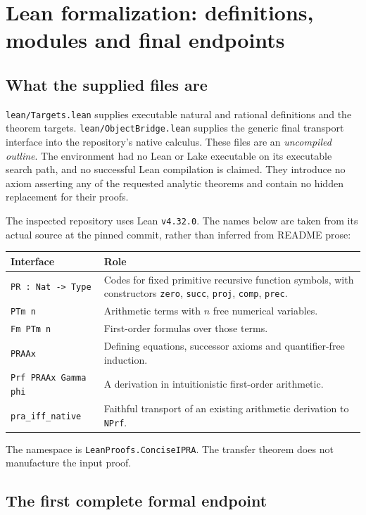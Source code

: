 \section{Lean formalization: definitions, modules and final endpoints}
\label{sec:lean}

\subsection{What the supplied files are}

\texttt{lean/Targets.lean} supplies executable natural and rational definitions and the theorem targets. \texttt{lean/ObjectBridge.lean} supplies the generic final transport interface into the repository's native calculus. These files are an \emph{uncompiled outline}. The environment had no Lean or Lake executable on its executable search path, and no successful Lean compilation is claimed. They introduce no axiom asserting any of the requested analytic theorems and contain no hidden replacement for their proofs.

The inspected repository uses Lean \texttt{v4.32.0}. The names below are taken from its actual source at the pinned commit, rather than inferred from README prose:
\begin{center}
\begin{tabularx}{\textwidth}{@{}p{48mm}X@{}}
\toprule
Interface & Role \\
\midrule
\texttt{PR : Nat -> Type} & Codes for fixed primitive recursive function symbols, with constructors \texttt{zero}, \texttt{succ}, \texttt{proj}, \texttt{comp}, \texttt{prec}. \\
\texttt{PTm n} & Arithmetic terms with $n$ free numerical variables. \\
\texttt{Fm PTm n} & First-order formulas over those terms. \\
\texttt{PRAAx} & Defining equations, successor axioms and quantifier-free induction. \\
\texttt{Prf PRAAx Gamma phi} & A derivation in intuitionistic first-order arithmetic. \\
\texttt{pra\_iff\_native} & Faithful transport of an existing arithmetic derivation to \texttt{NPrf}. \\
\bottomrule
\end{tabularx}
\end{center}
The namespace is \texttt{LeanProofs.ConciseIPRA}. The transfer theorem does not manufacture the input proof.

\subsection{The first complete formal endpoint}

